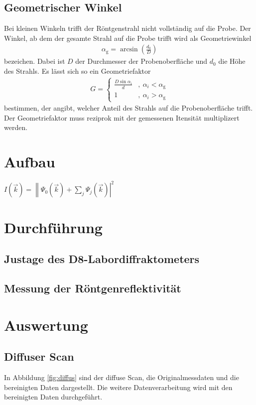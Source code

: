 \documentclass[captions=tableheading]{scrartcl}
\newcommand{\indx}[1]{\text{#1}}
\begin{document}
\subsection{Geometrischer Winkel}
Bei kleinen Winkeln trifft der Röntgenstrahl nicht vollständig auf die Probe. Der Winkel, ab dem der gesamte Strahl auf die Probe trifft wird als Geometriewinkel 
\begin{align}
\alpha_{\indx{g}}=\arcsin \left( \frac{d_0}{D} \right)
\end{align}
bezeichen. 
Dabei ist $D$ der Durchmesser der Probenoberfläche und $d_0$ die Höhe des Strahls.
Es lässt sich so ein Geometriefaktor 
\begin{align}
G=\left\lbrace\begin{matrix}
\frac{D \sin \alpha_{i} }{d} &,\ \alpha_{i} < \alpha_{\indx{g}} \\
1 &,\  \alpha_{i} > \alpha_{\indx{g}}
\end{matrix}\right.
\end{align}
bestimmen, der angibt, welcher Anteil des Strahls auf die Probenoberfläche trifft.
Der Geometriefaktor muss reziprok mit der gemessenen Itensität multiplizert werden.
\section{Aufbau}
$I\left(\vec{k}\right)=\left\|\Psi_0\left(\vec{k}\right)+\sum\limits_j\Psi_j\left( \vec{k} \right) \right|^2$

\section{Durchführung}

\subsection{Justage des D8-Labordiffraktometers}

\subsection{Messung der Röntgenreflektivität}

\section{Auswertung}

\subsection{Diffuser Scan}
In Abbildung \ref{fig:diffus} sind der diffuse Scan, die Originalmessdaten und die bereinigten Daten dargestellt. Die weitere Datenverarbeitung wird mit den bereinigten Daten durchgeführt.
\end{document}
